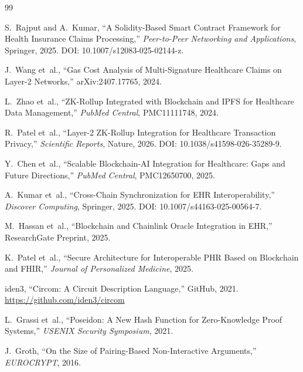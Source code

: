 \documentclass[journal]{IEEEtran}
\begin{document}

\begin{thebibliography}{99}

S.~Rajput and A.~Kumar, ``A Solidity-Based Smart Contract Framework for
Health Insurance Claims Processing,'' \textit{Peer-to-Peer Networking and
Applications}, Springer, 2025. DOI: 10.1007/s12083-025-02144-z.

J.~Wang et~al., ``Gas Cost Analysis of Multi-Signature Healthcare Claims on
Layer-2 Networks,'' arXiv:2407.17765, 2024.

L.~Zhao et~al., ``ZK-Rollup Integrated with Blockchain and IPFS for
Healthcare Data Management,'' \textit{PubMed Central},
PMC11111748, 2024.

R.~Patel et~al., ``Layer-2 ZK-Rollup Integration for Healthcare Transaction
Privacy,'' \textit{Scientific Reports}, Nature, 2026.
DOI: 10.1038/s41598-026-35289-9.

Y.~Chen et~al., ``Scalable Blockchain-AI Integration for Healthcare: Gaps and
Future Directions,'' \textit{PubMed Central}, PMC12650700, 2025.

A.~Kumar et~al., ``Cross-Chain Synchronization for EHR Interoperability,''
\textit{Discover Computing}, Springer, 2025.
DOI: 10.1007/s44163-025-00564-7.

M.~Hassan et~al., ``Blockchain and Chainlink Oracle Integration in EHR,''
ResearchGate Preprint, 2025.

K.~Patel et~al., ``Secure Architecture for Interoperable PHR Based on
Blockchain and FHIR,'' \textit{Journal of Personalized Medicine}, 2025.

iden3, ``Circom: A Circuit Description Language,'' GitHub, 2021.
\url{https://github.com/iden3/circom}

L.~Grassi et~al., ``Poseidon: A New Hash Function for Zero-Knowledge Proof
Systems,'' \textit{USENIX Security Symposium}, 2021.

J.~Groth, ``On the Size of Pairing-Based Non-Interactive Arguments,''
\textit{EUROCRYPT}, 2016.

\end{thebibliography}
\end{document}
